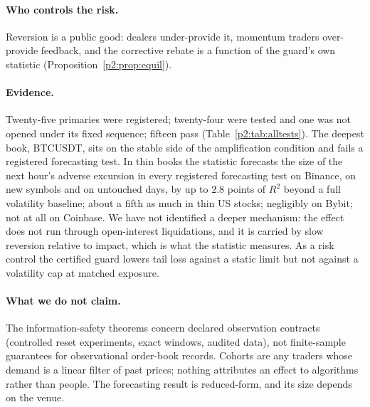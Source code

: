     \paragraph{Who controls the risk.} Reversion is a public good: dealers under-provide it, momentum traders over-provide feedback, and the corrective rebate is a function of the guard's own statistic (Proposition~\ref{p2:prop:equil}).

    \paragraph{Evidence.} Twenty-five primaries were registered; twenty-four were tested and one was not opened under its fixed sequence; fifteen pass (Table~\ref{p2:tab:alltests}). The deepest book, BTCUSDT, sits on the stable side of the amplification condition and fails a registered forecasting test. In thin books the statistic forecasts the size of the next hour's adverse excursion in every registered forecasting test on Binance, on new symbols and on untouched days, by up to $2.8$ points of $R^2$ beyond a full volatility baseline; about a fifth as much in thin US stocks; negligibly on Bybit; not at all on Coinbase. We have not identified a deeper mechanism: the effect does not run through open-interest liquidations, and it is carried by slow reversion relative to impact, which is what the statistic measures. As a risk control the certified guard lowers tail loss against a static limit but not against a volatility cap at matched exposure.

    \paragraph{What we do not claim.} The information-safety theorems concern declared observation contracts (controlled reset experiments, exact windows, audited data), not finite-sample guarantees for observational order-book records. Cohorts are any traders whose demand is a linear filter of past prices; nothing attributes an effect to algorithms rather than people. The forecasting result is reduced-form, and its size depends on the venue.

